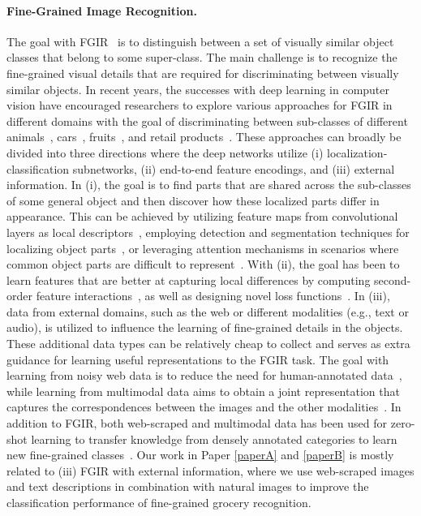 \paragraph{Fine-Grained Image Recognition.} 
The goal with FGIR~\cite{wei2021fine} is to distinguish between a set of visually similar object classes that belong to some super-class. The main challenge is to recognize the fine-grained visual details that are required for discriminating between visually similar objects. In recent years, the successes with deep learning in computer vision have encouraged researchers to explore various approaches for FGIR in different domains with the goal of discriminating between sub-classes of different animals~\cite{van2018inaturalist}, cars~\cite{krause2013stanford_cars}, fruits~\cite{hou2017vegfru}, and retail products~\cite{wei2019rpc}. These approaches can broadly be divided into three directions where the deep networks utilize (i) localization-classification subnetworks, (ii) end-to-end feature encodings, and (iii) external information. 
In (i), the goal is to find parts that are shared across the sub-classes of some general object and then discover how these localized parts differ in appearance. 
This can be achieved by utilizing feature maps from convolutional layers as local descriptors~\cite{zhang2016picking, wang2018learning, ding2019selective}, employing detection and segmentation techniques for localizing object parts~\cite{branson2014bird,zhang2014part,zhang2016weakly}, or leveraging attention mechanisms in scenarios where common object parts are difficult to represent~\cite{fu2017look,zheng2017learning,sun2018multi}. 
With (ii), the goal has been to learn features that are better at capturing local differences by computing second-order feature interactions~\cite{lin2015bilinear,cui2017kernel}, as well as designing novel loss functions~\cite{dubey2018maximum,dubey2018pairwise,chang2020devil}.
In (iii), data from external domains, such as the web or different modalities (e.g., text or audio), is utilized to influence the learning of fine-grained details in the objects. These additional data types can be relatively cheap to collect and serves as extra guidance for learning useful representations to the FGIR task. The goal with learning from noisy web data is to reduce the need for human-annotated data~\cite{krause2016unreasonable,xu2016webly,sun2019learning}, while learning from multimodal data aims to obtain a joint representation that captures the correspondences between the images and the other modalities~\cite{he2017fine,zhang2018audio,chen2018knowledge}. In addition to FGIR, both web-scraped and multimodal data has been used for zero-shot learning to transfer knowledge from densely annotated categories to learn new fine-grained classes~\cite{reed2016learning,niu2018webly,akata2015evaluation}. Our work in Paper \ref{paperA} and \ref{paperB} is mostly related to (iii) FGIR with external information, where we use web-scraped images and text descriptions in combination with natural images to improve the classification performance of fine-grained grocery recognition.


